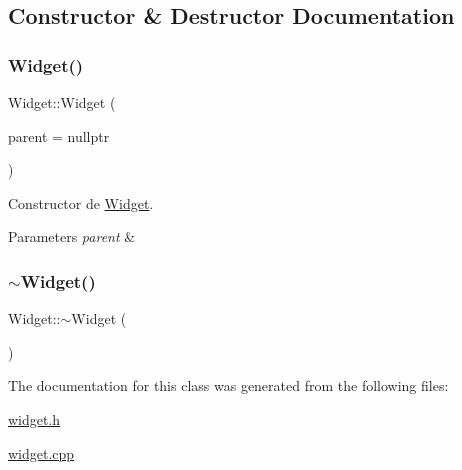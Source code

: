 \subsection{Constructor \& Destructor Documentation}
\mbox{\label{class_widget_ace1aa23652eb4425355a81760b39fd37}} 
\subsubsection{\texorpdfstring{Widget()}{Widget()}}
{\footnotesize\ttfamily Widget\+::\+Widget (\begin{DoxyParamCaption}\item[{Q\+Widget $\ast$}]{parent = {\ttfamily nullptr} }\end{DoxyParamCaption})\hspace{0.3cm}{\ttfamily [explicit]}}



Constructor de \hyperlink{class_widget}{Widget}. 


\begin{DoxyParams}{Parameters}
{\em parent} & \\
\hline
\end{DoxyParams}
\mbox{\label{class_widget_aa24f66bcbaaec6d458b0980e8c8eae65}} 
\subsubsection{\texorpdfstring{$\sim$\+Widget()}{~Widget()}}
{\footnotesize\ttfamily Widget\+::$\sim$\+Widget (\begin{DoxyParamCaption}{ }\end{DoxyParamCaption})}



The documentation for this class was generated from the following files\+:\begin{DoxyCompactItemize}
\item 
\hyperlink{widget_8h}{widget.\+h}\item 
\hyperlink{widget_8cpp}{widget.\+cpp}\end{DoxyCompactItemize}
